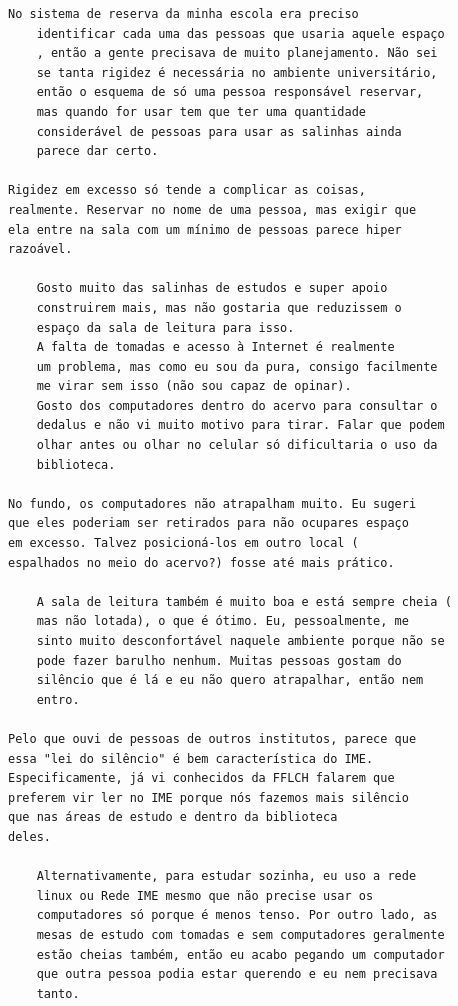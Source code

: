\documentclass[titlepage]{article}
\begin{document}
\begin{lstlisting}[caption=Enviado por Renato Cordeiro]
    No sistema de reserva da minha escola era preciso 
    identificar cada uma das pessoas que usaria aquele espaço
    , então a gente precisava de muito planejamento. Não sei 
    se tanta rigidez é necessária no ambiente universitário, 
    então o esquema de só uma pessoa responsável reservar, 
    mas quando for usar tem que ter uma quantidade 
    considerável de pessoas para usar as salinhas ainda 
    parece dar certo.

Rigidez em excesso só tende a complicar as coisas, 
realmente. Reservar no nome de uma pessoa, mas exigir que 
ela entre na sala com um mínimo de pessoas parece hiper 
razoável.

    Gosto muito das salinhas de estudos e super apoio 
    construirem mais, mas não gostaria que reduzissem o 
    espaço da sala de leitura para isso.
    A falta de tomadas e acesso à Internet é realmente 
    um problema, mas como eu sou da pura, consigo facilmente 
    me virar sem isso (não sou capaz de opinar).
    Gosto dos computadores dentro do acervo para consultar o 
    dedalus e não vi muito motivo para tirar. Falar que podem 
    olhar antes ou olhar no celular só dificultaria o uso da 
    biblioteca. 

No fundo, os computadores não atrapalham muito. Eu sugeri 
que eles poderiam ser retirados para não ocupares espaço 
em excesso. Talvez posicioná-los em outro local (
espalhados no meio do acervo?) fosse até mais prático.  

    A sala de leitura também é muito boa e está sempre cheia (
    mas não lotada), o que é ótimo. Eu, pessoalmente, me 
    sinto muito desconfortável naquele ambiente porque não se 
    pode fazer barulho nenhum. Muitas pessoas gostam do 
    silêncio que é lá e eu não quero atrapalhar, então nem 
    entro.

Pelo que ouvi de pessoas de outros institutos, parece que 
essa "lei do silêncio" é bem característica do IME. 
Especificamente, já vi conhecidos da FFLCH falarem que 
preferem vir ler no IME porque nós fazemos mais silêncio 
que nas áreas de estudo e dentro da biblioteca 
deles.

    Alternativamente, para estudar sozinha, eu uso a rede 
    linux ou Rede IME mesmo que não precise usar os 
    computadores só porque é menos tenso. Por outro lado, as 
    mesas de estudo com tomadas e sem computadores geralmente 
    estão cheias também, então eu acabo pegando um computador 
    que outra pessoa podia estar querendo e eu nem precisava 
    tanto.


\end{lstlisting}
\end{document}
